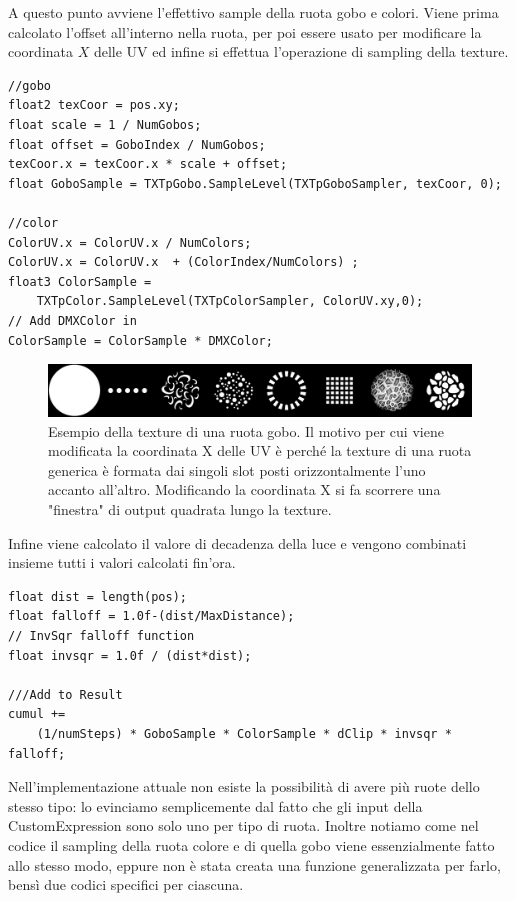\documentclass[main.tex]{subfiles}
\begin{document}
\noindent A questo punto avviene l'effettivo sample della ruota gobo e colori. Viene prima calcolato l'offset all'interno nella ruota, per poi essere usato per modificare la coordinata $X$ delle UV ed infine si effettua l'operazione di sampling della texture.
\begin{lstlisting}
//gobo
float2 texCoor = pos.xy;
float scale = 1 / NumGobos;
float offset = GoboIndex / NumGobos;
texCoor.x = texCoor.x * scale + offset;
float GoboSample = TXTpGobo.SampleLevel(TXTpGoboSampler, texCoor, 0);

//color
ColorUV.x = ColorUV.x / NumColors;
ColorUV.x = ColorUV.x  + (ColorIndex/NumColors) ;
float3 ColorSample =
    TXTpColor.SampleLevel(TXTpColorSampler, ColorUV.xy,0);
// Add DMXColor in
ColorSample = ColorSample * DMXColor;
\end{lstlisting}
\begin{figure}[H]
    \centering
    \includegraphics[width=1\linewidth]{img/renderingPipeline/Wheel_Rotating_Gobo_Wheel.jpg}
    \caption{Esempio della texture di una ruota gobo. Il motivo per cui viene modificata la coordinata X delle UV è perché la texture di una ruota generica è formata dai singoli slot posti orizzontalmente l'uno accanto all'altro. Modificando la coordinata X si fa scorrere una "finestra" di output quadrata lungo la texture.}
    \label{fig:2_goboWheel}
\end{figure}
Infine viene calcolato il valore di decadenza della luce e vengono combinati insieme tutti i valori calcolati fin'ora.
\begin{lstlisting}
float dist = length(pos);
float falloff = 1.0f-(dist/MaxDistance);
// InvSqr falloff function
float invsqr = 1.0f / (dist*dist);

///Add to Result
cumul +=
    (1/numSteps) * GoboSample * ColorSample * dClip * invsqr * falloff;
\end{lstlisting}

Nell'implementazione attuale non esiste la possibilità di avere più ruote dello stesso tipo: lo evinciamo semplicemente dal fatto che gli input della CustomExpression sono solo uno per tipo di ruota. Inoltre notiamo come nel codice il sampling della ruota colore e di quella gobo viene essenzialmente fatto allo stesso modo, eppure non è stata creata una funzione generalizzata per farlo, bensì due codici specifici per ciascuna. 
\end{document}
